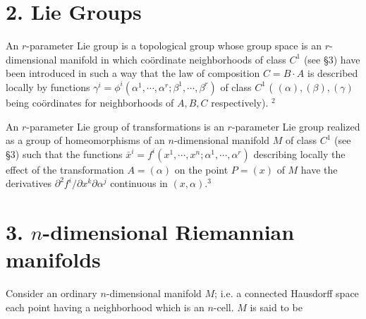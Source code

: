 \documentclass[10pt]{article}
\begin{document}
\section*{2. Lie Groups}
An $r$-parameter Lie group is a topological group whose group space is an $r$-dimensional manifold in which coördinate neighborhoods of class $C^{1}$ (see §3) have been introduced in such a way that the law of composition $C=B \cdot A$ is described locally by functions $\gamma^{i}=\phi^{i}\left(\alpha^{1}, \cdots, \alpha^{r} ; \beta^{1}, \cdots, \beta^{r}\right)$ of class $C^{1}$ ( $(\alpha),(\beta),(\gamma)$ being coördinates for neighborhoods of $A, B, C$ respectively). ${ }^{2}$

An $r$-parameter Lie group of transformations is an $r$-parameter Lie group realized as a group of homeomorphisms of an $n$-dimensional manifold $M$ of class $C^{1}$ (see §3) such that the functions $\bar{x}^{i}=f^{i}\left(x^{1}, \cdots, x^{n} ; \alpha^{1}, \cdots, \alpha^{r}\right)$ describing locally the effect of the transformation $A=(\alpha)$ on the point $P=(x)$ of $M$ have the derivatives $\partial^{2} f^{i} / \partial x^{k} \partial \alpha^{j}$ continuous in $(x, \alpha) .^{3}$

\section*{3. $n$-dimensional Riemannian manifolds}
Consider an ordinary $n$-dimensional manifold $M$; i.e. a connected Hausdorff space each point having a neighborhood which is an $n$-cell. $M$ is said to be
\end{document}
